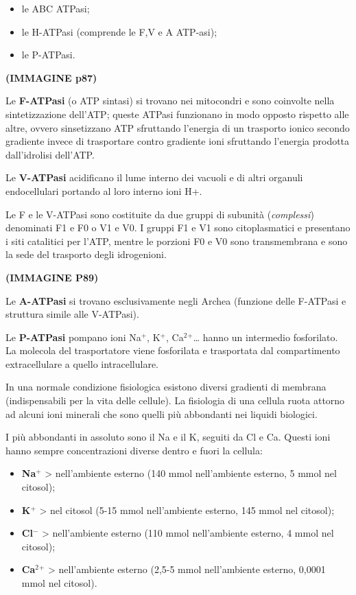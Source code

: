 \documentclass[]{article}
\begin{document}
\begin{itemize}
\itemsep1pt\parskip0pt
\item
  le ABC ATPasi;
\item
  le H-ATPasi (comprende le F,V e A ATP-asi);
\item
  le P-ATPasi.
\end{itemize}

\textbf{(IMMAGINE p87)}

Le \textbf{F-ATPasi} (o ATP sintasi) si trovano nei mitocondri e sono
coinvolte nella sintetizzazione dell'ATP; queste ATPasi funzionano in
modo opposto rispetto alle altre, ovvero sinsetizzano ATP sfruttando
l'energia di un trasporto ionico secondo gradiente invece di trasportare
contro gradiente ioni sfruttando l'energia prodotta dall'idrolisi
dell'ATP.

Le \textbf{V-ATPasi} acidificano il lume interno dei vacuoli e di altri
organuli endocellulari portando al loro interno ioni H+.

Le F e le V-ATPasi sono costituite da due gruppi di subunità
(\emph{complessi}) denominati F1 e F0 o V1 e V0. I gruppi F1 e V1 sono
citoplasmatici e presentano i siti catalitici per l'ATP, mentre le
porzioni F0 e V0 sono transmembrana e sono la sede del trasporto degli
idrogenioni.

\textbf{(IMMAGINE P89)}

Le \textbf{A-ATPasi} si trovano esclusivamente negli Archea (funzione
delle F-ATPasi e struttura simile alle V-ATPasi).

Le \textbf{P-ATPasi} pompano ioni Na\(^+\), K\(^+\),
Ca\(^2\)\(^+\)\ldots{} hanno un intermedio fosforilato. La molecola del
trasportatore viene fosforilata e trasportata dal compartimento
extracellulare a quello intracellulare.

In una normale condizione fisiologica esistono diversi gradienti di
membrana (indispensabili per la vita delle cellule). La fisiologia di
una cellula ruota attorno ad alcuni ioni minerali che sono quelli più
abbondanti nei liquidi biologici.

I più abbondanti in assoluto sono il Na e il K, seguiti da Cl e Ca.
Questi ioni hanno sempre concentrazioni diverse dentro e fuori la
cellula:

\begin{itemize}
\itemsep1pt\parskip0pt
\item
  \textbf{Na\(^+\)} \textgreater{} nell'ambiente esterno (140 mmol
  nell'ambiente esterno, 5 mmol nel citosol);
\item
  \textbf{K\(^+\)} \textgreater{} nel citosol (5-15 mmol nell'ambiente
  esterno, 145 mmol nel citosol);
\item
  \textbf{Cl\(^-\)} \textgreater{} nell'ambiente esterno (110 mmol
  nell'ambiente esterno, 4 mmol nel citosol);
\item
  \textbf{Ca\(^2\)\(^+\)} \textgreater{} nell'ambiente esterno (2,5-5
  mmol nell'ambiente esterno, 0,0001 mmol nel citosol).
\end{itemize}
\end{document}
